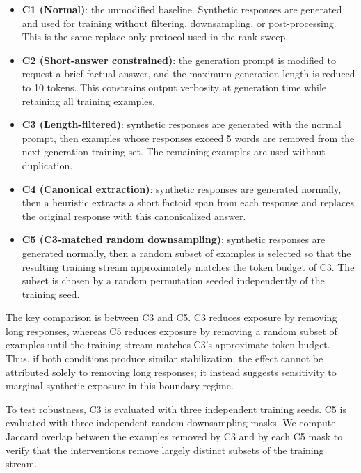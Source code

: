 \documentclass[a4paper,fleqn]{cas-dc}
\begin{document}
\begin{itemize}
    \item \textbf{C1 (Normal)}: the unmodified baseline. Synthetic responses are
    generated and used for training without filtering, downsampling, or
    post-processing. This is the same replace-only protocol used in the rank
    sweep.

    \item \textbf{C2 (Short-answer constrained)}: the generation prompt is
    modified to request a brief factual answer, and the maximum generation length
    is reduced to 10 tokens. This constrains output verbosity at generation time
    while retaining all training examples.

    \item \textbf{C3 (Length-filtered)}: synthetic responses are generated with
    the normal prompt, then examples whose responses exceed 5 words are removed
    from the next-generation training set. The remaining examples are used
    without duplication.

    \item \textbf{C4 (Canonical extraction)}: synthetic responses are generated
    normally, then a heuristic extracts a short factoid span from each response
    and replaces the original response with this canonicalized answer.

    \item \textbf{C5 (C3-matched random downsampling)}: synthetic responses are
    generated normally, then a random subset of examples is selected so that the
    resulting training stream approximately matches the token budget of C3. The
    subset is chosen by a random permutation seeded independently of the training
    seed.
\end{itemize}

The key comparison is between C3 and C5. C3 reduces exposure by removing long
responses, whereas C5 reduces exposure by removing a random subset of examples
until the training stream matches C3's approximate token budget. Thus, if both
conditions produce similar stabilization, the effect cannot be attributed solely
to removing long responses; it instead suggests sensitivity to marginal
synthetic exposure in this boundary regime.

To test robustness, C3 is evaluated with three independent training seeds.
C5 is evaluated with three independent random downsampling masks.
We compute Jaccard overlap between the examples removed by C3 and by each C5
mask to verify that the interventions remove largely distinct subsets of the
training stream.
\end{document}
